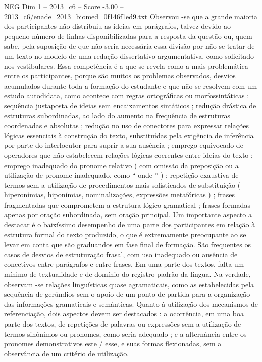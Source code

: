 \begin{textsample}{NEG Dim 1 – 2013\_c6 – Score -3.00 – 2013\_c6/enade\_2013\_biomed\_0f146f1ed9.txt}
Observou -se que a grande maioria dos participantes não distribuiu as ideias em parágrafos, talvez devido ao pequeno número de linhas disponibilizadas para a resposta da questão ou, quem sabe, pela suposição de que não seria necessária essa divisão por não se tratar de um texto no modelo de uma redação dissertativo-argumentativa, como solicitado nos vestibulares.
Essa competência é a que se revela como a mais problemática entre os participantes, porque são muitos os problemas observados, desvios acumulados durante toda a formação do estudante e que não se resolvem com um estudo autodidata, como acontece com regras ortográficas ou morfossintáticas : sequência justaposta de ideias sem encaixamentos sintáticos ; redução drástica de estruturas subordinadas, ao lado do aumento na frequência de estruturas coordenadas e absolutas ; redução no uso de conectores para expressar relações lógicas essenciais à construção do texto, substituídas pela exigência de inferência por parte do interlocutor para suprir a sua ausência ; emprego equivocado de operadores que não estabelecem relações lógicas coerentes entre ideias do texto ; emprego inadequado do pronome relativo ( com omissão da preposição ou a utilização de pronome inadequado, como “ onde ” ) ; repetição exaustiva de termos sem a utilização de procedimentos mais sofisticados de substituição ( hiperonímias, hiponímias, nominalizações, expressões metafóricas ) ; frases fragmentadas que comprometem a estrutura lógico-gramatical ; frases formadas apenas por oração subordinada, sem oração principal.
Um importante aspecto a destacar é o baixíssimo desempenho de uma parte dos participantes em relação à estrutura formal do texto produzido, o que é extremamente preocupante ao se levar em conta que são graduandos em fase final de formação.
São frequentes os casos de desvios de estruturação frasal, com uso inadequado ou ausência de conectivos entre parágrafos e entre frases.
Em uma parte dos textos, falta um mínimo de textualidade e de domínio do registro padrão da língua.
Na verdade, observam -se relações linguísticas quase agramaticais, como as estabelecidas pela sequência de gerúndios sem o apoio de um ponto de partida para a organização das informações gramaticais e semânticas.
Quanto à utilização dos mecanismos de referenciação, dois aspectos devem ser destacados : a ocorrência, em uma boa parte dos textos, de repetições de palavras ou expressões sem a utilização de termos sinônimos ou pronomes, como seria adequado ; e a alternância entre os pronomes demonstrativos este / esse, e suas formas flexionadas, sem a observância de um critério de utilização.

\end{textsample}
